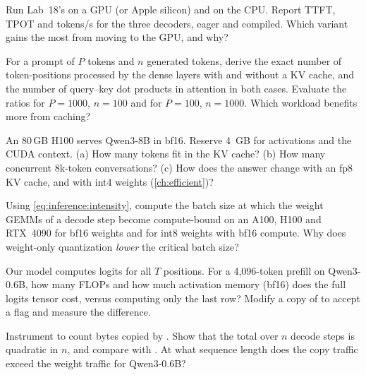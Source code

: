 \begin{exercise}
Run Lab~18's  on a GPU (or Apple silicon) and on the CPU. Report TTFT, TPOT and
tokens/s for the three decoders, eager and compiled. Which variant gains the most from moving to
the GPU, and why?
\end{exercise}

\begin{exercise}
For a prompt of $P$ tokens and $n$ generated tokens, derive the exact number of token-positions
processed by the dense layers with and without a KV cache, and the number of query--key dot
products in attention in both cases. Evaluate the ratios for $P=1000$, $n=100$ and for $P=100$,
$n=1000$. Which workload benefits more from caching?
\end{exercise}

\begin{exercise}
An 80\,GB H100 serves Qwen3-8B in bf16. Reserve \SI{4}{GB} for activations and the CUDA context.
(a) How many tokens fit in the KV cache? (b) How many concurrent 8k-token conversations? (c) How
does the answer change with an fp8 KV cache, and with int4 weights (\cref{ch:efficient})?
\end{exercise}

\begin{exercise}
Using \cref{eq:inference:intensity}, compute the batch size at which the weight GEMMs of a decode
step become compute-bound on an A100, H100 and RTX~4090 for bf16 weights and for int8 weights with
bf16 compute. Why does weight-only quantization \emph{lower} the critical batch size?
\end{exercise}

\begin{exercise}
Our model computes logits for all $T$ positions. For a 4,096-token prefill on Qwen3-0.6B, how many
FLOPs and how much activation memory (bf16) does the full logits tensor cost, versus computing only
the last row? Modify a copy of  to accept a  flag and
measure the difference.
\end{exercise}

\begin{exercise}
Instrument  to count bytes copied by . Show that the total over
$n$ decode steps is quadratic in $n$, and compare with . At what sequence length
does the copy traffic exceed the weight traffic for Qwen3-0.6B?
\end{exercise}

